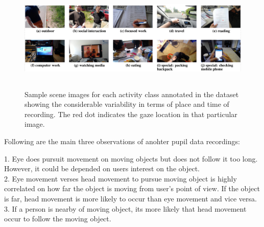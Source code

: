 \begin{figure}[!hbt]
  \centering
  \includegraphics[width=5in,height=2in]{obs3.png}
  \caption{Sample scene images for each activity class annotated in the dataset showing the considerable variability in terms of place and time of recording. The red dot indicates the gaze location in that particular image.}
  \label{obs3}
\end{figure}

Following are the main three observations of anohter pupil data recordings:

1. Eye does pursuit movement on moving objects but does not follow it too long. However, it could be depended on users interest on the object.\\

2. Eye movement verses head movement to pursue moving object is highly correlated on how far the object is moving from user's point of view. If the object is far, head movement is more likely to occur than eye movement and vice versa.\\

3. If a person is nearby of moving object, its more likely that head movement occur to follow the moving object.\\




%   

  \newpage


